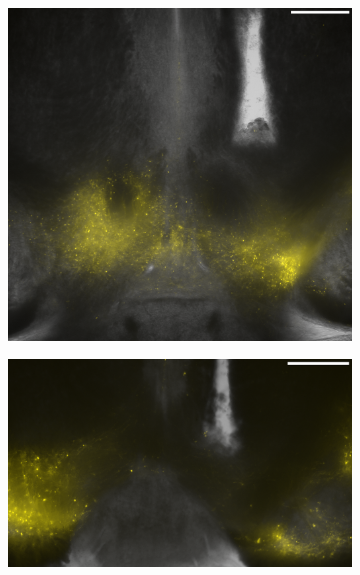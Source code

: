 \begin{figure}[h!]
	\begin{subfigure}{.269\textwidth}
		\centering
		\includegraphics[width=\textwidth]{img/sub-6591_slice-b1_zoom-5_scene-3_transmission-yfp-comb_straight.png}
                \caption{}
                \label{fig:h6591}
	\end{subfigure}
	\begin{subfigure}{.43\textwidth}
		\centering
		\includegraphics[width=\textwidth]{img/sub-6589_slice-a4_zoom-5_scene-2_transmission-yfp-comb_straight.png}
                \caption{}
		\label{fig:h6589}
	\end{subfigure}

\end{figure}
